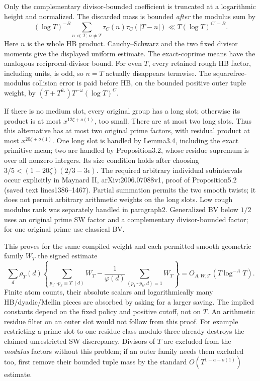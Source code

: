 Only the complementary divisor-bounded coefficient is truncated
at a logarithmic height and normalized. The discarded mass is
bounded \emph{after} the modulus sum by
\[
 (\log T)^{-B}\sum_{n\ll T,\ n\ne T}
       \tau_C(n)\tau_C(|T-n|)
       \ll T(\log T)^{C'-B}.
\]
Here $n$ is the whole HB product. Cauchy--Schwarz and the two
fixed divisor moments give the displayed uniform estimate.
The exact-coprime means have the analogous reciprocal-divisor
bound. For even $T$, every retained rough HB factor, including
units, is odd, so $n=T$ actually disappears termwise. The
squarefree-modulus collision error is paid before HB, on the
bounded positive outer tuple weight, by
$(T+T^{\theta_*})T^{-\omega}(\log T)^C$.

If there is no medium slot, every original group has a long slot;
otherwise its product is at most $x^{12\zeta+o(1)}$, too small.
There are at most two long slots. Thus this alternative has at most
two original prime factors, with residual product at most
$x^{20\zeta+o(1)}$. One long slot is handled by Lemma3.4, including
the exact primitive mean; two are handled by Proposition3.2, whose
residue supremum is over all nonzero integers. Its size condition
holds after choosing
$3/5<(1-20\zeta)(2/3-3\epsilon)$.
The required arbitrary individual subintervals occur explicitly
in Maynard II, arXiv:2006.07088v1, proof of Proposition5.2
(saved text lines1386--1467). Partial summation permits the two
smooth twists; it does not permit arbitrary arithmetic weights
on the long slots. Low rough modulus rank was separately handled
in paragraph2. Generalized BV below $1/2$ uses an original prime
SW factor and a complementary divisor-bounded factor; for one
original prime use classical BV.

This proves for the same compiled weight and each permitted smooth
geometric family $W_T$ the signed estimate
\[
 \sum_d\rho_T(d)\left\{
 \sum_{p_1\cdots p_k\equiv T\ (d)}W_T
 -\frac1{\varphi(d)}\sum_{(p_1\cdots p_k,d)=1}W_T\right\}
 =O_{A,W,\mathcal T}(T\log^{-A}T).
\]
Finite atom counts, their absolute scalars and logarithmically many
HB/dyadic/Mellin pieces are absorbed by asking for a larger saving.
The implied constants depend on the fixed policy and positive
cutoff, not on $T$. An arithmetic residue filter on an outer slot
would not follow from this proof. For example restricting a prime
slot to one residue class modulo three already destroys the
claimed unrestricted SW discrepancy. Divisors of $T$ are excluded
from the \emph{modulus} factors without this problem; if an outer
family needs them excluded too, first remove their bounded tuple
mass by the standard $O(T^{1-a+o(1)})$ estimate.

